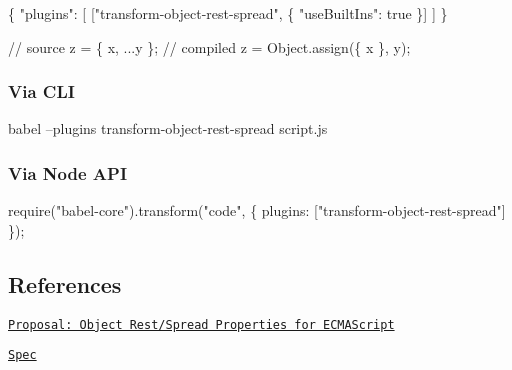 \begin{DoxyCode}
\{
  "plugins": [
    ["transform-object-rest-spread", \{ "useBuiltIns": true \}]
  ]
\}

// source
z = \{ x, ...y \};
// compiled
z = Object.assign(\{ x \}, y);
\end{DoxyCode}


\subsubsection*{Via C\+LI}


\begin{DoxyCode}
babel --plugins transform-object-rest-spread script.js
\end{DoxyCode}


\subsubsection*{Via Node A\+PI}


\begin{DoxyCode}
require("babel-core").transform("code", \{
  plugins: ["transform-object-rest-spread"]
\});
\end{DoxyCode}


\subsection*{References}


\begin{DoxyItemize}
\item \href{https://github.com/sebmarkbage/ecmascript-rest-spread}{\tt Proposal\+: Object Rest/\+Spread Properties for E\+C\+M\+A\+Script}
\item \href{http://sebmarkbage.github.io/ecmascript-rest-spread}{\tt Spec} 
\end{DoxyItemize}